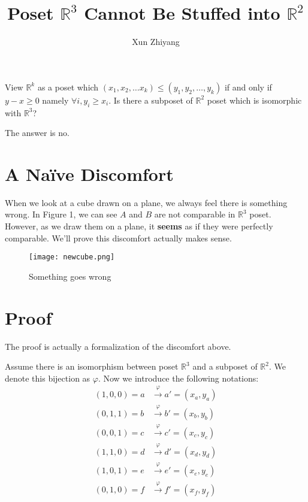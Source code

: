 \documentclass[UTF8]{ctexart}
\title{Poset $\mathbb{R}^3$ Cannot Be Stuffed into $\mathbb{R}^2$}
\author{Xun Zhiyang}
\theoremstyle{definition}
\begin{document}
\maketitle

\begin{pro}
    View $\mathbb{R}^{k}$ as a poset which $\left( x_1,x_2,\ldots x_{k}\right) \le 
    \left( y_1,y_2,\ldots,y_{k} \right) $ if and only if
    $y-x\ge 0$ namely $\forall i,y_i \ge  x_i$. Is there
    a subposet of $\mathbb{R}^{2}$ poset which is isomorphic with $\mathbb{R}^{3}$?
\end{pro}

The answer is no.

\section{A Naïve Discomfort}

When we look at a cube drawn on a plane, we always feel there is something wrong. In Figure 1, we can see $A$ and $B$ are not comparable in $\mathbb{R}^3$ poset. However, as we draw them on a plane, it \textbf{seems} as if they were perfectly comparable. We'll prove this discomfort actually makes sense.

\begin{figure}[ht]
        \centering
        \texttt{[image: newcube.png]}
        \caption{Something goes wrong}
\end{figure}

\section{Proof}

The proof is actually a formalization of the discomfort above.

Assume there is an isomorphism between poset $\mathbb{R}^3$ and a subposet of $\mathbb{R}^2$. We denote this bijection as $\varphi$. Now we introduce the following notations:
\begin{align*}
    (1, 0, 0) = a &\stackrel{\varphi}{\longrightarrow} a' = (x_a, y_a) \\
    (0, 1, 1) = b &\stackrel{\varphi}{\longrightarrow} b' = (x_b, y_b) \\
    (0, 0, 1) = c &\stackrel{\varphi}{\longrightarrow} c' = (x_c, y_c) \\
    (1, 1, 0) = d &\stackrel{\varphi}{\longrightarrow} d' = (x_d, y_d) \\
    (1, 0, 1) = e &\stackrel{\varphi}{\longrightarrow} e' = (x_e, y_e) \\
    (0, 1, 0) = f &\stackrel{\varphi}{\longrightarrow} f' = (x_f, y_f)
\end{align*}
\end{document}

